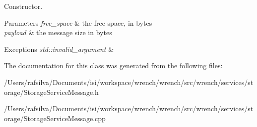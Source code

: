Constructor. 


\begin{DoxyParams}{Parameters}
{\em free\+\_\+space} & the free space, in bytes \\
\hline
{\em payload} & the message size in bytes\\
\hline
\end{DoxyParams}

\begin{DoxyExceptions}{Exceptions}
{\em std\+::invalid\+\_\+argument} & \\
\hline
\end{DoxyExceptions}


The documentation for this class was generated from the following files\+:\begin{DoxyCompactItemize}
\item 
/\+Users/rafsilva/\+Documents/isi/workspace/wrench/wrench/src/wrench/services/storage/Storage\+Service\+Message.\+h\item 
/\+Users/rafsilva/\+Documents/isi/workspace/wrench/wrench/src/wrench/services/storage/Storage\+Service\+Message.\+cpp\end{DoxyCompactItemize}
